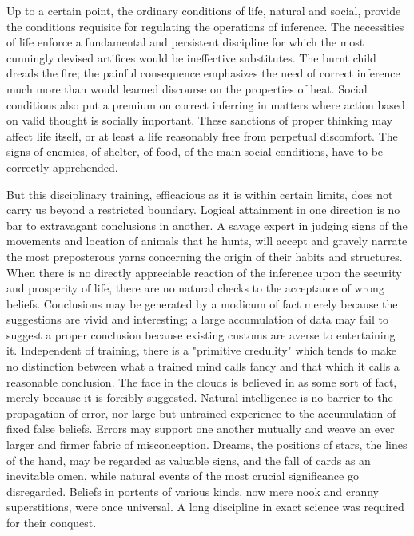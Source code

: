 \documentclass[showtrims,ustradepaper]{memoir}
\begin{document}

Up to a certain point, the ordinary conditions of life, natural and
social, provide the conditions requisite for regulating the operations
of inference. The necessities of life enforce a fundamental and
persistent discipline for which the most cunningly devised artifices
would be ineffective substitutes. The burnt child dreads the fire; the
painful consequence emphasizes the need of correct inference much more
than would learned discourse on the properties of heat. Social
conditions also put a premium on correct inferring in matters where
action based on valid thought is socially important. These sanctions of
proper thinking may affect life itself, or at least a life reasonably
free from perpetual discomfort. The signs of enemies, of shelter, of
food, of the main social conditions, have to be correctly apprehended.


But this disciplinary training, efficacious as it is within certain
limits, does not carry us beyond a restricted boundary. Logical
attainment in one direction is no bar to extravagant conclusions in
another. A savage expert in judging signs of the movements and location
of animals that he hunts, will accept and gravely narrate the most
preposterous yarns concerning the origin of their habits and structures.
When there is no directly appreciable reaction of the inference upon the
security and prosperity of life, there are no natural checks to the
acceptance of wrong beliefs. Conclusions may be generated by a modicum
of fact merely because the suggestions are vivid and interesting; a
large accumulation of data may fail to suggest a proper conclusion
because existing customs are averse to entertaining it. Independent of
training, there is a "primitive
credulity"
which tends to make no distinction between what a trained mind calls
fancy and that which it calls a reasonable conclusion. The face in the
clouds is believed in as some sort of fact, merely because it is
forcibly suggested. Natural intelligence is no barrier to the
propagation of error, nor large but untrained experience to the
accumulation of fixed false beliefs. Errors may support one another
mutually and weave an ever larger and firmer fabric of misconception.
Dreams, the positions of stars, the lines of the hand, may be regarded
as valuable signs, and the fall of cards as an inevitable omen, while
natural events of the most crucial significance go disregarded. Beliefs
in portents of various kinds, now mere nook and cranny superstitions,
were once universal. A long discipline in exact science was required for
their conquest.
\end{document}
